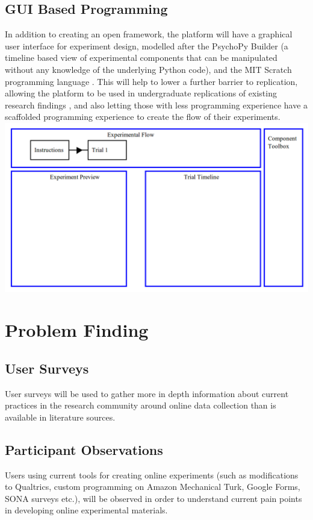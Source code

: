 \documentclass[12pt,a4paper,titlepage]{scrreprt}
\begin{document}
\subsection{GUI Based Programming}
In addition to creating an open framework, the platform will have a graphical user interface for experiment design, modelled after the PsychoPy Builder (a timeline based view of experimental components that can be manipulated without any knowledge of the underlying Python code), and the MIT Scratch programming language \parencite{resnick_scratch:_2009}. This will help to lower a further barrier to replication, allowing the platform to be used in undergraduate replications of existing research findings  \parencite{frank_teaching_2012}, and also letting those with less programming experience have a scaffolded programming experience to create the flow of their experiments.\\
\includegraphics[scale=0.4]{edit_interface}\\
\section{Problem Finding}
\subsection{User Surveys}
User surveys will be used to gather more in depth information about current practices in the research community around online data collection than is available in literature sources.
\subsection{Participant Observations}
Users using current tools for creating online experiments (such as modifications to Qualtrics, custom programming on Amazon Mechanical Turk, Google Forms, SONA surveys etc.), will be observed in order to understand current pain points in developing online experimental materials.
\end{document}
